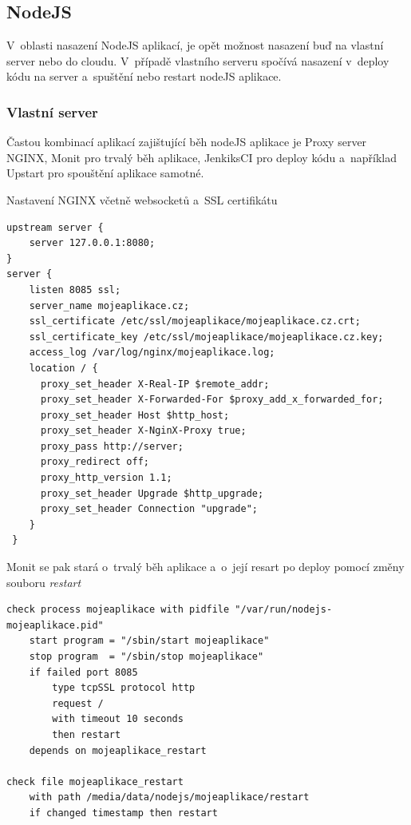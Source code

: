 \documentclass[a4paper,12pt,twoside,BCOR=10mm]{article}
\renewcommand{\it}[1]{\textit{#1}}    %
\newenvironment{codeframe}{%
  \begin{Sbox} 
    \begin{minipage} 
      {\columnwidth-\leftmargin-\rightmargin-2\fboxsep-2\fboxrule-4pt} 
}{%

  \end{minipage} 
  \end{Sbox} 
  \begin{center} 
    \fcolorbox{black}{codeback}{\TheSbox} 
  \end{center} 
}
\begin{document}
\subsection{NodeJS}
V~oblasti nasazení NodeJS aplikací, je opět možnost nasazení buď na vlastní server nebo do cloudu. V~případě vlastního serveru spočívá nasazení v~deploy kódu na server a~spuštění nebo restart nodeJS aplikace.\\

\subsubsection{Vlastní server}
Častou kombinací aplikací zajištující běh nodeJS aplikace je Proxy server NGINX, Monit pro trvalý běh aplikace, JenkiksCI pro deploy kódu a~například Upstart pro spouštění aplikace samotné.

Nastavení NGINX včetně websocketů a~SSL certifikátu
\begin{codeframe}
  \begin{verbatim}
upstream server {
    server 127.0.0.1:8080;
}
server {
    listen 8085 ssl;
    server_name mojeaplikace.cz;
    ssl_certificate /etc/ssl/mojeaplikace/mojeaplikace.cz.crt;
    ssl_certificate_key /etc/ssl/mojeaplikace/mojeaplikace.cz.key;
    access_log /var/log/nginx/mojeaplikace.log;
    location / {
      proxy_set_header X-Real-IP $remote_addr;
      proxy_set_header X-Forwarded-For $proxy_add_x_forwarded_for;
      proxy_set_header Host $http_host;
      proxy_set_header X-NginX-Proxy true;
      proxy_pass http://server;
      proxy_redirect off;
      proxy_http_version 1.1;
      proxy_set_header Upgrade $http_upgrade;
      proxy_set_header Connection "upgrade";
    }
 }
  \end{verbatim}
\end{codeframe}

Monit se pak stará o~trvalý běh aplikace a~o~její resart po deploy pomocí změny souboru \it{restart}
\begin{codeframe}
  \begin{verbatim}
check process mojeaplikace with pidfile "/var/run/nodejs-mojeaplikace.pid"
    start program = "/sbin/start mojeaplikace"
    stop program  = "/sbin/stop mojeaplikace"
    if failed port 8085
        type tcpSSL protocol http
        request /
        with timeout 10 seconds
        then restart
    depends on mojeaplikace_restart

check file mojeaplikace_restart
    with path /media/data/nodejs/mojeaplikace/restart
    if changed timestamp then restart
  \end{verbatim}
\end{codeframe}
\end{document}
